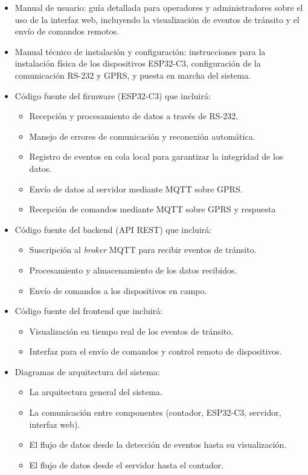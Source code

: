 \documentclass[
11pt, %
]{charter}
\begin{document}
\begin{itemize}
	\item Manual de usuario: guía detallada para operadores y administradores sobre el uso de la interfaz web, incluyendo la visualización de eventos de tránsito y el envío de comandos remotos.
	\item Manual técnico de instalación y configuración: instrucciones para la instalación física de los dispositivos ESP32-C3, configuración de la comunicación RS-232 y GPRS, y puesta en marcha del sistema.
	\item Código fuente del firmware (ESP32-C3) que incluirá:
	\begin{itemize}
	\item Recepción y procesamiento de datos a través de RS-232.
	\item Manejo de errores de comunicación y reconexión automática.
	\item Registro de eventos en cola local para garantizar la integridad de los datos.
	\item Envío de datos al servidor mediante MQTT sobre GPRS.
	\item Recepción de comandos mediante MQTT sobre GPRS y respuesta
	\end{itemize}

\item Código fuente del backend (API REST) que incluirá:

\begin{itemize}
\item Suscripción al \textit{broker} MQTT para recibir eventos de tránsito.
\item Procesamiento y almacenamiento de los datos recibidos.
\item Envío de comandos a los dispositivos en campo. 
\end{itemize}

\item Código fuente del frontend que incluirá:
\begin{itemize}
\item Visualización en tiempo real de los eventos de tránsito.
\item Interfaz para el envío de comandos y control remoto de dispositivos.
\end{itemize}

\item Diagramas de arquitectura del sistema:
\begin{itemize}
\item La arquitectura general del sistema.
\item La comunicación entre componentes (contador, ESP32-C3, servidor, interfaz web).
\item El flujo de datos desde la detección de eventos hasta su visualización.
\item El flujo de datos desde el servidor hasta el contador.
\end{itemize}


\end{itemize}
\end{document}
